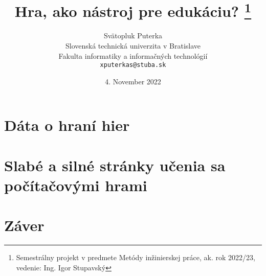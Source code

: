 \documentclass[10pt,twoside,slovak,a4paper]{article}
\date{\small 4. November 2022}
\begin{document}
\begin{titlepage}
	\title{Hra, ako nástroj pre edukáciu?
	\thanks{Semestrálny projekt v predmete Metódy inžinierskej práce, ak. rok 2022/23, vedenie: Ing. Igor Stupavský}} 
	\author{Svätopluk Puterka\\[2pt]
		{\small Slovenská technická univerzita v Bratislave}\\
		{\small Fakulta informatiky a informačných technológií}\\
		{\small \texttt{xputerkas@stuba.sk}}
	}
\end{titlepage}

{\maketitle }







\section{Dáta o hraní hier}\label{data-o-hrani}
\section{Slabé a silné stránky učenia sa počítačovými hrami}\label{vyhody-nevyhody-hier}
\section{Záver} \label{zaver}

 

\end{document}
